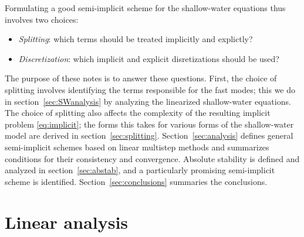 \documentclass[12pt]{article}
\begin{document}
Formulating a good semi-implicit scheme for the shallow-water equations thus
involves two choices:
\begin{itemize} 
\setlength{\itemsep}{1pt} \setlength{\parsep}{0pt}
\setlength{\topsep}{0pt} \setlength{\partopsep}{0pt}
\item
\emph{Splitting}:  
which terms should be treated implicitly and explictly?
\item
\emph{Discretization}:  
which implicit and explicit disretizations should be used?
\end{itemize} 
The purpose of these notes is to answer these questions.  First, the choice of
splitting involves identifying the terms responsible for the fast modes; this
we do in section~\ref{sec:SWanalysis} by analyzing the linearized
shallow-water equations.  The choice of splitting also affects the complexity
of the resulting implicit problem \eqref{eq:implicit}; the forms this takes
for various forms of the shallow-water model are derived in
section~\ref{sec:splitting}.  Section~\ref{sec:analysis} defines general
semi-implicit schemes based on linear multistep methods and summarizes
conditions for their consistency and convergence.  Absolute stability is
defined and analyzed in section~\ref{sec:abstab}, and a particularly promising
semi-implicit scheme is identified.  Section~\ref{sec:conclusions} summaries
the conclusions.

\pagebreak[4]
\section{Linear analysis\label{sec:SWanalysis}}
\setcounter{equation}{0}
\end{document}
